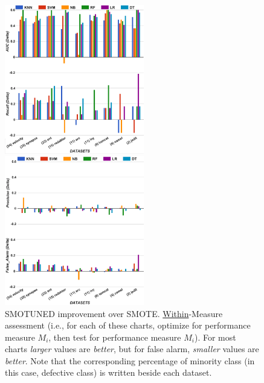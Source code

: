 \documentclass[sigconf,review, anonymous]{acmart}
\theoremstyle{break}
\theoremstyle{break}
\begin{document}
\begin{figure}[!t]
\begin{minipage}{.5\linewidth}
\centering
        \includegraphics[width=.95\linewidth,height=6.5cm]{./fig/AUC_recall_tuned.png}
    \end{minipage}%
\begin{minipage}{.5\linewidth}
        \centering
        \includegraphics[width=.95\linewidth,height=6.5cm]{./fig/prec_pf_tuned.png}
    \end{minipage}%
    
    \caption{SMOTUNED improvement over SMOTE. \underline{Within}-Measure
    assessment (i.e., for each of these charts,
    optimize for performance measure $M_i$, then test for
    performance measure $M_i$). For most charts
    {\em larger} values are {\em better}, but for false alarm,
    {\em smaller} values are {\em better}. Note that the corresponding percentage of minority class (in this case, defective class) is written beside each dataset.}
    \label{fig:tuned}
\end{figure}
\end{document}

